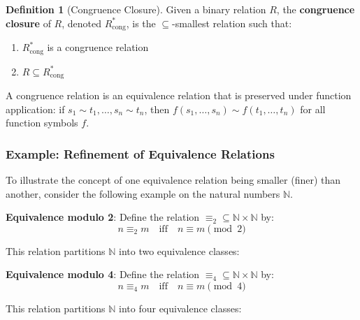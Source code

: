 \documentclass[11pt,a4paper]{article}
\theoremstyle{definition}
\newtheorem{definition}{Definition}[section]
\theoremstyle{plain}
\theoremstyle{remark}
\newcommand{\N}{\mathbb{N}}
\begin{document}
\begin{tcolorbox}[colback=green!5!white,colframe=green!75!black,title=\textbf{Congruence Closure}]
\begin{definition}[Congruence Closure]
Given a binary relation $R$, the \textbf{congruence closure} of $R$, denoted $R^*_{\text{cong}}$, is the $\subseteq$-smallest relation such that:
\begin{enumerate}
    \item $R^*_{\text{cong}}$ is a congruence relation
    \item $R \subseteq R^*_{\text{cong}}$
\end{enumerate}
\end{definition}
\end{tcolorbox}

A congruence relation is an equivalence relation that is preserved under function application: if $s_1 \sim t_1, \dots, s_n \sim t_n$, then $f(s_1, \dots, s_n) \sim f(t_1, \dots, t_n)$ for all function symbols $f$.

\subsubsection{Example: Refinement of Equivalence Relations}

To illustrate the concept of one equivalence relation being smaller (finer) than another, consider the following example on the natural numbers $\N$.

\textbf{Equivalence modulo 2}: Define the relation $\equiv_2 \subseteq \N \times \N$ by:
\[
n \equiv_2 m \quad \text{iff} \quad n \equiv m \pmod{2}
\]

This relation partitions $\N$ into two equivalence classes:
\begin{center}
\end{center}

\textbf{Equivalence modulo 4}: Define the relation $\equiv_4 \subseteq \N \times \N$ by:
\[
n \equiv_4 m \quad \text{iff} \quad n \equiv m \pmod{4}
\]

This relation partitions $\N$ into four equivalence classes:
\begin{center}
\end{center}
\end{document}
